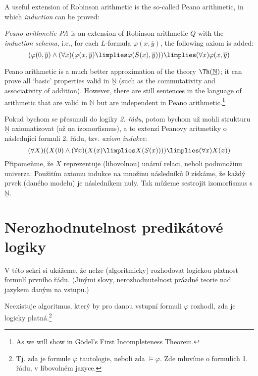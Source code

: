 A useful extension of Robinson arithmetic is the so-called Peano arithmetic, in which \emph{induction} can be proved:

\begin{definition}
\emph{Peano arithmetic} $\text{\it PA}$ is an extension of Robinson arithmetic $Q$ with the \emph{induction schema}, i.e., for each $L$-formula $\varphi(x, \overline{y})$, the following axiom is added:
$$
(\varphi(0, \overline{y}) \land (\forall x)(\varphi(x, \overline{y}) \limplies \varphi(S(x), \overline{y}))) \limplies (\forall x)\varphi(x, \overline{y})
$$
\end{definition}

Peano arithmetic is a much better approximation of the theory $\Th(\underline{\mathbb{N}})$; it can prove all `basic' properties valid in $\underline{\mathbb{N}}$ (such as the commutativity and associativity of addition). However, there are still sentences in the language of arithmetic that are valid in $\underline{\mathbb{N}}$ but are independent in Peano arithmetic.\footnote{As we will show in Gödel's First Incompleteness Theorem.} 










\begin{remark}
Pokud bychom se přesunuli do logiky \emph{2. řádu}, potom bychom už mohli strukturu $\underline{\mathbb N}$ axiomatizovat (až na izomorfismus), a to extenzí Peanovy aritmetiky o následující formuli 2. řádu, tzv. \emph{axiom indukce}:
$$
(\forall X)((X(0) \land (\forall x)(X(x) \limplies X(S(x)))) \limplies (\forall x)X(x))
$$
Připomeňme, že $X$ reprezentuje (libovolnou) unární relaci, neboli podmnožinu univerza. Použitím axiomu indukce na množinu následníků 0 získáme, že každý prvek (daného modelu) je následníkem nuly. Tak můžeme sestrojit izomorfismus s $\underline{\mathbb N}$.
\end{remark}

\section{Nerozhodnutelnost predikátové logiky}
    
V této sekci si ukážeme, že nelze (algoritmicky) rozhodovat logickou platnost formulí prvního řádu. (Jinými slovy, nerozhodnutelnost prázdné teorie nad jazykem daným na vstupu.)

\begin{theorem}\label{theorem:undecidability-of-predicate-logic}
Neexistuje algoritmus, který by pro danou vstupní formuli $\varphi$ rozhodl, zda je logicky platná.\footnote{Tj. zda je formule $\varphi$ tautologie, neboli zda $\models\varphi$. Zde mluvíme o formulích 1. řádu, v libovolném jazyce.}
\end{theorem}

